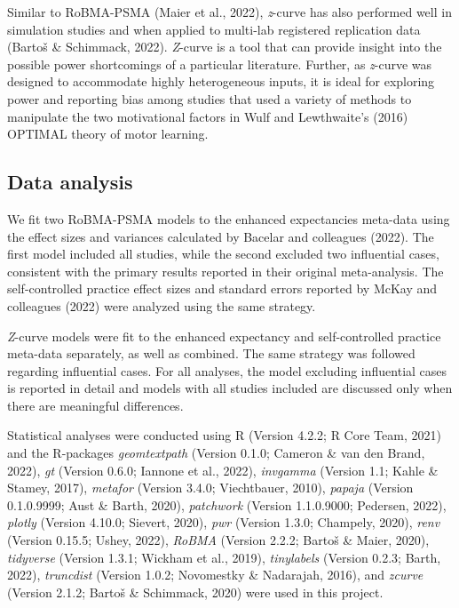 \documentclass[
  man, donotrepeattitle,mask,floatsintext]{apa7}
\begin{document}
Similar to RoBMA-PSMA (Maier et al., 2022), \emph{z}-curve has also performed well in simulation studies and when applied to multi-lab registered replication data (Bartoš \& Schimmack, 2022). \emph{Z}-curve is a tool that can provide insight into the possible power shortcomings of a particular literature. Further, as \emph{z}-curve was designed to accommodate highly heterogeneous inputs, it is ideal for exploring power and reporting bias among studies that used a variety of methods to manipulate the two motivational factors in Wulf and Lewthwaite's (2016) OPTIMAL theory of motor learning.

\hypertarget{data-analysis}{%
\subsection{Data analysis}\label{data-analysis}}

We fit two RoBMA-PSMA models to the enhanced expectancies meta-data using the effect sizes and variances calculated by Bacelar and colleagues (2022). The first model included all studies, while the second excluded two influential cases, consistent with the primary results reported in their original meta-analysis. The self-controlled practice effect sizes and standard errors reported by McKay and colleagues (2022) were analyzed using the same strategy.

\emph{Z}-curve models were fit to the enhanced expectancy and self-controlled practice meta-data separately, as well as combined. The same strategy was followed regarding influential cases. For all analyses, the model excluding influential cases is reported in detail and models with all studies included are discussed only when there are meaningful differences.

Statistical analyses were conducted using R (Version 4.2.2; R Core Team, 2021) and the R-packages \emph{geomtextpath} (Version 0.1.0; Cameron \& van den Brand, 2022), \emph{gt} (Version 0.6.0; Iannone et al., 2022), \emph{invgamma} (Version 1.1; Kahle \& Stamey, 2017), \emph{metafor} (Version 3.4.0; Viechtbauer, 2010), \emph{papaja} (Version 0.1.0.9999; Aust \& Barth, 2020), \emph{patchwork} (Version 1.1.0.9000; Pedersen, 2022), \emph{plotly} (Version 4.10.0; Sievert, 2020), \emph{pwr} (Version 1.3.0; Champely, 2020), \emph{renv} (Version 0.15.5; Ushey, 2022), \emph{RoBMA} (Version 2.2.2; Bartoš \& Maier, 2020), \emph{tidyverse} (Version 1.3.1; Wickham et al., 2019), \emph{tinylabels} (Version 0.2.3; Barth, 2022), \emph{truncdist} (Version 1.0.2; Novomestky \& Nadarajah, 2016), and \emph{zcurve} (Version 2.1.2; Bartoš \& Schimmack, 2020) were used in this project.
\end{document}
